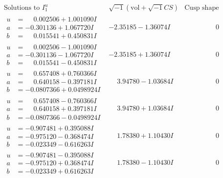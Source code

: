 \documentclass[1p]{elsarticle_modified}
\theoremstyle{definition}
\newcommand{\I}{\sqrt{-1}}
\begin{document}
$$\begin{array}{c|c|c}  
\text{Solutions to }I^u_{1}& \I (\text{vol} + \sqrt{-1}CS) & \text{Cusp shape}\\
 \hline 
\begin{aligned}
u &= \phantom{-}0.002506 + 1.001090 I \\
a &= -0.301136 + 1.067720 I \\
b &= \phantom{-}0.015541 + 0.450831 I\end{aligned}
 & -2.35185 - 1.36074 I & \phantom{-0.000000 } 0 \\ \hline\begin{aligned}
u &= \phantom{-}0.002506 - 1.001090 I \\
a &= -0.301136 - 1.067720 I \\
b &= \phantom{-}0.015541 - 0.450831 I\end{aligned}
 & -2.35185 + 1.36074 I & \phantom{-0.000000 } 0 \\ \hline\begin{aligned}
u &= \phantom{-}0.657408 + 0.760366 I \\
a &= \phantom{-}0.640158 - 0.397181 I \\
b &= -0.0807366 + 0.0498924 I\end{aligned}
 & \phantom{-}3.94780 - 1.03684 I & \phantom{-0.000000 } 0 \\ \hline\begin{aligned}
u &= \phantom{-}0.657408 - 0.760366 I \\
a &= \phantom{-}0.640158 + 0.397181 I \\
b &= -0.0807366 - 0.0498924 I\end{aligned}
 & \phantom{-}3.94780 + 1.03684 I & \phantom{-0.000000 } 0 \\ \hline\begin{aligned}
u &= -0.907481 + 0.395088 I \\
a &= -0.975120 - 0.368474 I \\
b &= -0.023349 - 0.616263 I\end{aligned}
 & \phantom{-}1.78380 + 1.10430 I & \phantom{-0.000000 } 0 \\ \hline\begin{aligned}
u &= -0.907481 - 0.395088 I \\
a &= -0.975120 + 0.368474 I \\
b &= -0.023349 + 0.616263 I\end{aligned}
 & \phantom{-}1.78380 - 1.10430 I & \phantom{-0.000000 } 0 \\ \hline\begin{aligned}

\end{aligned}
\end{array}$$
\end{document}
